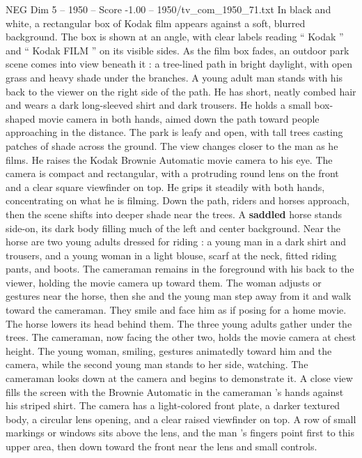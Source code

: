 \begin{textsample}{NEG Dim 5 – 1950 – Score -1.00 – 1950/tv\_com\_1950\_71.txt}  \label{ex:f5_neg_028}
In black and white, a rectangular box of Kodak film appears against a soft, blurred background.
The box is shown at an angle, with clear labels reading “ Kodak ” and “ Kodak FILM ” on its visible sides.
As the film box fades, an outdoor park scene comes into view beneath it : a tree-lined path in bright daylight, with open grass and heavy shade under the branches.
A young adult man stands with his back to the viewer on the right side of the path.
He has short, neatly combed hair and wears a dark long-sleeved shirt and dark trousers.
He holds a small box-shaped movie camera in both hands, aimed down the path toward people approaching in the distance.
The park is leafy and open, with tall trees casting patches of shade across the ground.
The view changes closer to the man as he films.
He raises the Kodak Brownie Automatic movie camera to his eye.
The camera is compact and rectangular, with a protruding round lens on the front and a clear square viewfinder on top.
He grips it steadily with both hands, concentrating on what he is filming.
Down the path, riders and horses approach, then the scene shifts into deeper shade near the trees.
A \textbf{saddled} horse stands side-on, its dark body filling much of the left and center background.
Near the horse are two young adults dressed for riding : a young man in a dark shirt and trousers, and a young woman in a light blouse, scarf at the neck, fitted riding pants, and boots.
The cameraman remains in the foreground with his back to the viewer, holding the movie camera up toward them.
The woman adjusts or gestures near the horse, then she and the young man step away from it and walk toward the cameraman.
They smile and face him as if posing for a home movie.
The horse lowers its head behind them.
The three young adults gather under the trees.
The cameraman, now facing the other two, holds the movie camera at chest height.
The young woman, smiling, gestures animatedly toward him and the camera, while the second young man stands to her side, watching.
The cameraman looks down at the camera and begins to demonstrate it.
A close view fills the screen with the Brownie Automatic in the cameraman ’s hands against his striped shirt.
The camera has a light-colored front plate, a darker textured body, a circular lens opening, and a clear raised viewfinder on top.
A row of small markings or windows sits above the lens, and the man ’s fingers point first to this upper area, then down toward the front near the lens and small controls.

\end{textsample}
